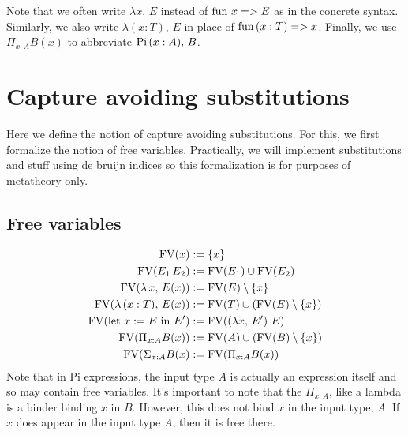 \documentclass{article}
\begin{document}
Note that we often write $\lambda x, \, E$ instead of $\operatorname{fun} \, x => E$ as in the
concrete syntax. Similarly, we also write $\lambda (x : T), \, E$ in place of
$\operatorname{fun} \, (x : T) => x$.
Finally, we use $\Pi_{x : A}B(x)$ to abbreviate $\operatorname{Pi} \, (x : A), \, B$.

\section{Capture avoiding substitutions}
Here we define the notion of capture avoiding substitutions. For this, we first
formalize the notion of free variables.
Practically, we will implement substitutions and stuff using de bruijn indices
so this formalization is for purposes of metatheory only.

\subsection{Free variables}
\begin{align*}
  \operatorname{FV} (x) &:= \{x\} \\
  \operatorname{FV} (E_1 \, E_2) &:= \operatorname{FV}(E_1) \cup \operatorname{FV}(E_2) \\
  \operatorname{FV} (\lambda \, x, \, E(x)) &:= \operatorname{FV}(E) \setminus \{x\} \\
  \operatorname{FV} (\lambda \, (x : T), \, E(x)) &:= \operatorname{FV}(T) \cup (\operatorname{FV}(E) \setminus \{x\}) \\
  \operatorname{FV} (\text{let } x := E \text{ in } E') &:= \operatorname{FV}((\lambda x, \, E') \,\, E) \\
  \operatorname{FV} (\Pi_{x : A} B(x)) &:= \operatorname{FV}(A) \cup (\operatorname{FV}(B) \setminus \{x\}) \\
  \operatorname{FV} (\Sigma_{x : A} B(x) &:= \operatorname{FV}(\Pi_{x : A} B(x))
\end{align*}
Note that in Pi expressions, the input type $A$ is actually an expression itself
and so may contain free variables. It's important to note that the $\Pi_{x :
  A}$, like a lambda is a binder binding $x$ in $B$. However, this does not bind
$x$ in the input type, $A$. If $x$ does appear in the input type $A$, then it is
free there.
\end{document}
